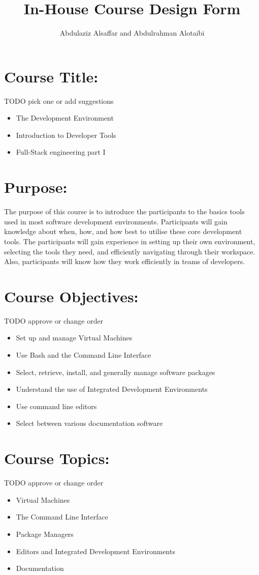 \documentclass[a4paper,11pt]{article}
\author{Abdulaziz Alsa{f}far and Abdulrahman Alotaibi}
\title{In-House Course Design Form}
\begin{document}
\maketitle
\pagestyle{plain}
\setcounter{page}{1}

\section{Course Title:}
TODO pick one or add suggestions
\begin{itemize}
    \item The Development Environment
    \item Introduction to Developer Tools
    \item Full-Stack engineering part I
\end{itemize}

\section{Purpose:}
The purpose of this course is to introduce the participants to the basics tools used in most software development environments.
Participants will gain knowledge about when, how, and how best to utilise these core development tools. 
The participants will gain experience in setting up their own environment, selecting the tools they need, and e{f}ficiently navigating through their workspace. Also, participants will know how they work ef{}ficiently in teams of developers.

\section{Course Objectives:}
TODO approve or change order
\begin{itemize}
		\item Set up and manage Virtual Machines
		\item Use Bash and the Command Line Interface
		\item Select, retrieve, install, and generally manage software packages
		\item Understand the use of Integrated Development Environments
		\item Use command line editors
		\item Select between various documentation software
\end{itemize}

\section{Course Topics:}
TODO approve or change order
\begin{itemize}
		\item Virtual Machines
		\item The Command Line Interface
		\item Package Managers
		\item Editors and Integrated Development Environments
		\item Documentation
\end{itemize}
\end{document}
